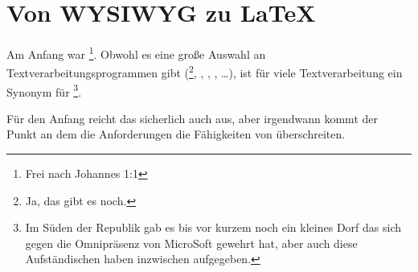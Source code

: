 \chapter{Von WYSIWYG zu \LaTeX}

\noindent Am Anfang war \footnote{Frei nach Johannes 1:1}.
Obwohl es eine große Auswahl an Textverarbeitungsprogrammen gibt
(\footnote{Ja, das gibt es noch.}, , , , \dots),
ist für viele Textverarbeitung ein Synonym für %
\footnote{Im Süden der Republik gab es bis vor kurzem noch ein kleines Dorf 
das sich gegen die Omnipräsenz von MicroSoft gewehrt hat,
aber auch diese Aufständischen haben inzwischen aufgegeben.}.

Für den Anfang reicht das sicherlich auch aus, aber irgendwann kommt der Punkt an dem die Anforderungen die Fähigkeiten von  überschreiten.
